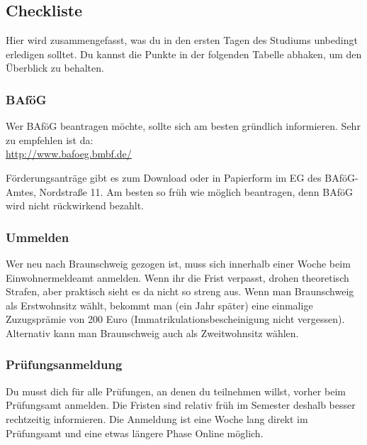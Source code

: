 
\subsection{Checkliste}
\label{checkliste}
\begin{multicols}{2}
	Hier wird zusammengefasst, was du in den ersten Tagen des Studiums
	unbedingt erledigen solltet. Du kannst die Punkte in der folgenden
	Tabelle abhaken, um den Überblick zu behalten.
\end{multicols}


\begin{multicols}{2}
\subsubsection{BAföG}
	\label{todobafoeg}

	Wer BAföG beantragen möchte, sollte sich am besten gründlich informieren. Sehr zu empfehlen ist da: \\
	\url{http://www.bafoeg.bmbf.de/}
 
	Förderungsanträge gibt es zum Download oder in Papierform im EG des BAföG-Amtes, Nordstraße 11. Am besten so früh wie möglich beantragen, denn BAföG wird nicht rückwirkend bezahlt.


\subsubsection{Ummelden}
	\label{todoummelden}

	Wer neu nach Braunschweig gezogen ist, muss sich innerhalb einer Woche beim Einwohnermeldeamt anmelden. Wenn ihr die Frist verpasst, drohen theoretisch Strafen, aber praktisch sieht es da nicht so streng aus. Wenn man Braunschweig als Erstwohnsitz wählt, bekommt man (ein Jahr später) eine einmalige Zuzugsprämie von 200 Euro (Immatrikulationsbescheinigung nicht vergessen). Alternativ kann man Braunschweig auch als Zweitwohnsitz wählen.

\subsubsection{Prüfungsanmeldung}
	\label{todoanmeldung}

	Du musst dich für alle Prüfungen, an denen du teilnehmen willst, vorher beim Prüfungsamt anmelden. Die Fristen sind relativ früh im Semester deshalb besser rechtzeitig informieren. Die Anmeldung ist eine Woche lang direkt im Prüfungsamt und eine etwas längere Phase Online möglich.


\end{multicols}
